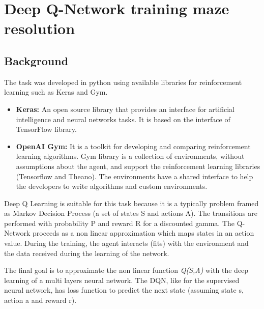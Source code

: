 \chapter{Deep Q-Network training maze resolution}
\section{Background}
The task was developed in python using available libraries for reinforcement learning such as Keras and Gym.
\begin{itemize}
    \item \textbf{Keras: }An open source library that provides an interface for artificial intelligence and neural networks tasks. It is based on the interface of TensorFlow library.
    \item \textbf{OpenAI Gym: }It is a toolkit for developing and comparing reinforcement learning algorithms. Gym library is a collection of environments, without assumptions about the agent, and support the reinforcement learning libraries (Tensorflow and Theano). The environments have a shared interface to help the developers to write algorithms and custom environments.
\end{itemize}

Deep Q Learning is suitable for this task because it is a typically problem framed as Markov Decision Process (a set of states S and actions A). The transitions are performed with probability P and reward R for a discounted gamma. 
The Q-Network proceeds as a non linear approximation which maps states in an action value. During the training, the agent interacts (fits) with the environment and the data received during the learning of the network.

The final goal is to approximate the non linear function \textit{Q(S,A)} with the deep learning of a multi layers neural network. The DQN, like for the supervised neural network, has loss function to predict the next state (assuming state s, action a and reward r).

